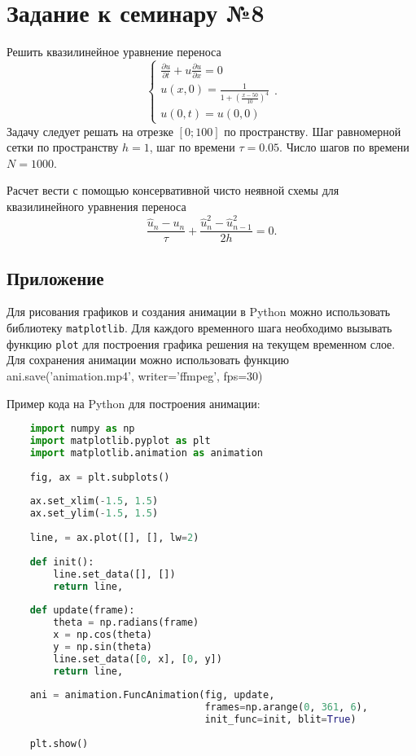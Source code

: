 \documentclass{report}
\begin{document}
\section*{Задание к семинару №8}
Решить квазилинейное уравнение переноса
\begin{equation} \label{c8eq1}
	\begin{cases}
		\displaystyle \frac{\partial u}{\partial t} + u \frac{\partial u}{\partial x} = 0 \\
		\displaystyle u(x,0) = \frac{1}{1 + \left( \displaystyle \frac{x-50}{10} \right)^4} \\
		u(0,t) = u(0,0) 
	\end{cases}.
\end{equation}
Задачу следует решать на отрезке $[0; 100]$ по пространству. Шаг равномерной сетки по пространству $h = 1$, шаг по времени $\tau = 0.05$. Число шагов по времени $N = 1000$.

Расчет вести с помощью консервативной чисто неявной схемы для квазилинейного уравнения переноса
\begin{equation} \label{c8eq2}
	\frac{\hat{u}_n - u_n}{\tau} + \frac{\hat{u}^2_n - \hat{u}^2_{n-1}}{2h} = 0.	
\end{equation}

\subsection*{Приложение}
Для рисования графиков и создания анимации в Python можно использовать библиотеку \texttt{matplotlib}. Для каждого временного шага необходимо вызывать функцию \texttt{plot} для построения графика решения на текущем временном слое.
Для сохранения анимации можно использовать функцию ani.save('animation.mp4', writer='ffmpeg', fps=30)

Пример кода на Python для построения анимации:
\begin{lstlisting}[language=Python]
    %matplotlib notebook
    import numpy as np
    import matplotlib.pyplot as plt
    import matplotlib.animation as animation
    
    fig, ax = plt.subplots()
    
    ax.set_xlim(-1.5, 1.5)
    ax.set_ylim(-1.5, 1.5)
    
    line, = ax.plot([], [], lw=2)
    
    def init():
        line.set_data([], [])
        return line,
    
    def update(frame):
        theta = np.radians(frame) 
        x = np.cos(theta) 
        y = np.sin(theta)
        line.set_data([0, x], [0, y]) 
        return line,
    
    ani = animation.FuncAnimation(fig, update, 
                                  frames=np.arange(0, 361, 6), 
                                  init_func=init, blit=True)
    
    plt.show()
    
    
\end{lstlisting}
\end{document}
